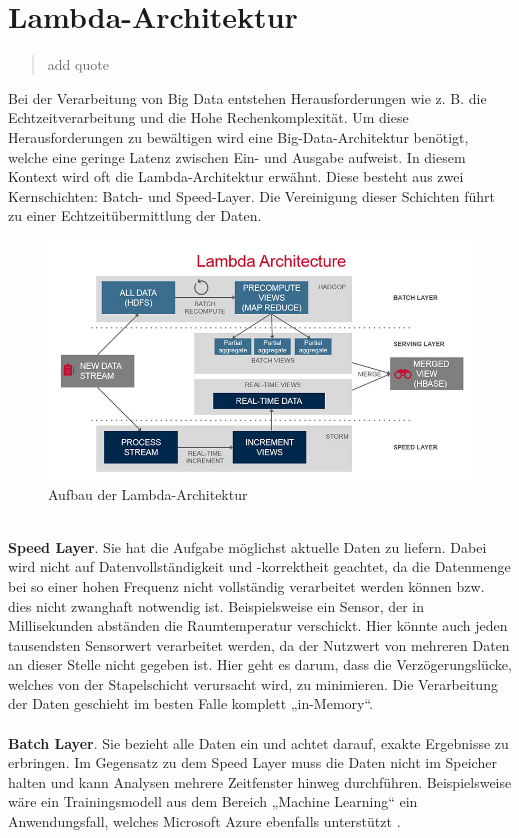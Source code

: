 \section{Lambda-Architektur}

\begin{quote}\glqq add quote \grqq~\cite[S.14]{Roth.2016}\end{quote} 
Bei der Verarbeitung von Big Data entstehen Herausforderungen wie z. B. die Echtzeitverarbeitung und die Hohe Rechenkomplexität. Um diese Herausforderungen zu bewältigen wird eine Big-Data-Architektur benötigt, welche eine geringe Latenz zwischen Ein- und Ausgabe aufweist. In diesem Kontext wird oft die Lambda-Architektur erwähnt. Diese besteht aus zwei Kernschichten: Batch- und Speed-Layer. Die Vereinigung dieser Schichten führt zu einer Echtzeitübermittlung der Daten.
\begin{figure}[h!]
	\centering
	\includegraphics[width=1.0\linewidth]{images/lambda-architecture}
	\caption{Aufbau der Lambda-Architektur} %
	\label{fig:cnn_structure}
\end{figure}
\\ \textbf{Speed Layer}. Sie hat die Aufgabe möglichst aktuelle Daten zu liefern. Dabei wird nicht auf Datenvollständigkeit und -korrektheit geachtet, da die Datenmenge bei so einer hohen Frequenz nicht vollständig verarbeitet werden können bzw. dies nicht zwanghaft notwendig ist. Beispielsweise ein Sensor, der in Millisekunden abständen die Raumtemperatur verschickt. Hier könnte auch jeden tausendsten Sensorwert verarbeitet werden, da der Nutzwert von mehreren Daten an dieser Stelle nicht gegeben ist. Hier geht es darum, dass die Verzögerungslücke, welches von der Stapelschicht verursacht wird, zu minimieren. Die Verarbeitung der Daten geschieht im besten Falle komplett „in-Memory“.\\ \\ \textbf{Batch Layer}. Sie bezieht alle Daten ein und achtet darauf, exakte Ergebnisse zu erbringen. Im Gegensatz zu dem Speed Layer muss die Daten nicht im Speicher halten und kann Analysen mehrere Zeitfenster hinweg durchführen. Beispielsweise wäre ein Trainingsmodell aus dem Bereich „Machine Learning“ ein Anwendungsfall, welches Microsoft Azure ebenfalls unterstützt \cite{Berle.2017}. 

